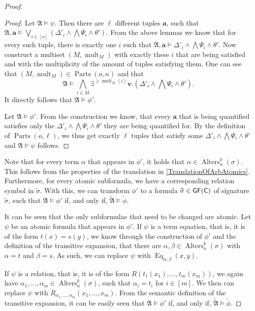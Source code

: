 \begin{proof}
\begin{proof}
		Let $\mathfrak A\models \psi$.
		Then there are $\ell$ different tuples $\mathbf a$, such that $\mathfrak A,\mathbf a \models \bigvee_{i\in[o]}(\Delta'_i\land\bigwedge\Psi_i\land\theta')$.
		From the above lemmas we know that for every such tuple, there is exactly one $i$ such that $\mathfrak A,\mathbf a\models \Delta'_i\land\bigwedge \Psi_i\land \theta'$.
		Now construct a multiset $(M,\operatorname{mult}_M)$ with exactly these $i$ that are being satisfied and with the multiplicity of the amount of tuples satisfying them.
		One can see that $(M,\operatorname{mult}_M)\in \operatorname{Parts}(o,n)$ and that 
		$$\mathfrak A \models \bigwedge_{i\in M}\exists^{\geq\operatorname{mult}_M(i)}\mathbf v. (\Delta'_i\land \bigwedge\Psi_i\land \theta').$$
		It directly follows that $\mathfrak A\models \phi'$.
		
		Let $\mathfrak A\models \phi'$.
		From the construction we know, that every $\mathbf a$ that is being quantified satisfies only the $\Delta'_i\land\bigwedge\Psi_i\land\theta'$ they are being quantified for.
		By the definition of $\operatorname{Parts}(o,\ell)$, we thus get exactly $\ell$ tuples that satisfy some $\Delta'_i\land\bigwedge\Psi_i\land\theta'$ and $\mathfrak A\models \psi$ follows.
	\end{proof}
	
	Note that for every term $\alpha$ that appears in $\phi'$, it holds that $\alpha\in \operatorname{Alters}^k_n(\sigma)$.
	This follows from the properties of the translation in \cref{TranslationOfArbAtomics}.
	Furthermore, for every atomic subformula, we have a corresponding relation symbol in $\widetilde{\sigma}$.
	With this, we can transform $\phi'$ to a formula $\widetilde{\sigma}\in\mathsf{GF}(\mathsf{C})$ of signature $\widetilde{\sigma}$, such that $\mathfrak A\models \phi'$ if, and only if, $\widetilde{\mathfrak A}\models \widetilde{\phi}$.
	
	It can be seen that the only subformulae that need to be changed are atomic.
	Let $\psi$ be an atomic formula that appears in $\phi'$.
	If $\psi$ is a term equation, that is, it is of the form $t(x)=s(y)$, we know through the construction of $\phi'$ and the definition of the transitive expansion, that there are $\alpha,\beta\in \operatorname{Alters}^k_n(\sigma)$ with $\alpha=t$ and $\beta=s$. 
	As such, we can replace $\psi$ with $\operatorname{Eq}_{\alpha,\beta}(x,y)$.
	
	If $\psi$ is a relation, that is, it is of the form $R(t_1(x_1),\dots,t_m(x_m))$, we again have $\alpha_1,\dots,\alpha_m\in \operatorname{Alters}^k_n(\sigma)$, such that $\alpha_i=t_i$ for $i\in[m]$.
	We then can replace $\psi$ with $R_{\alpha_1,\dots,\alpha_m}(x_1,\dots,x_m)$.
	From the semantic definition of the transitive expansion, it can be easily seen that $\mathfrak A\models \phi'$ if, and only if, $\widetilde{\mathfrak A}\models \widetilde{\phi}$.
	

\end{proof}
